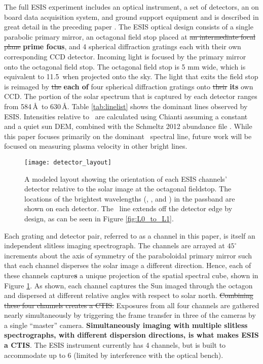 	  	
    	The full ESIS experiment includes an optical instrument, a set of detectors, an on board data acquisition system, and ground support equipment and is described in great detail in the preceding paper \citep{ESIS}.
    	The ESIS optical design consists of a single parabolic primary mirror, an octagonal field stop placed at \sout{an intermediate focal plane} \textbf{prime focus}, and 4 spherical diffraction gratings each with their own corresponding CCD detector.
    	Incoming light is focused by the primary mirror onto the octagonal field stop. 
    	The octagonal field stop is  5 mm wide, which is equivalent to %
    	11.5\arcmin \  when projected onto the sky. 
    	The light that exits the field stop is reimaged  by \sout{the} \textbf{each of} four spherical diffraction gratings onto \sout{their} \textbf{its} own CCD.
    	The portion of the solar spectrum that is captured by each detector ranges from  584\,\AA \ to 630\,\AA. 
    	Table \ref{tab:linelist} shows the dominant lines observed by ESIS.
    	Intensities relative to \ov \ are calculated using Chianti \citep{ChiantiI,ChiantiX} assuming a constant and a quiet sun DEM, combined with the Schmeltz 2012 abundance file \citep{schmelz2012}.
  		While this paper focuses primarily on the dominant \ov \ spectral line, future work will be focused on measuring plasma velocity in other bright lines.
   			
        \begin{figure}
			\begin{center}
				\texttt{[image: detector\_layout]}
				\caption{A modeled layout showing the orientation of each ESIS channels' detector relative to the solar image at the octagonal fieldstop.  The locations of the brightest wavelengths (\hei, \mgxbright, and \ov) in the passband are shown on each detector.  The \hei \ line  extends off the detector edge by design, as can be seen in Figure \ref{fig:L0_to_L1}. }
				\label{fig:level_1_array}
			\end{center}
		\end{figure}

    	Each grating and detector pair, referred to as a channel in this paper,
    	is itself an independent slitless imaging spectrograph.  
    	The channels are arrayed at $45^{\circ}$ increments about the axis of symmetry of the paraboloidal primary mirror such that each channel disperses the solar image a different direction. 
    	Hence, each of these channels capture\textbf{s} a unique projection of the spatial spectral cube, shown in Figure \ref{fig:level_1_array}. 
    	As shown, each channel captures the Sun imaged through the octagon and dispersed at different relative angles with respect to solar north. 
    	\sout{Combining these four channels creates a CTIS.}
    	Exposures from all four channels are gathered nearly simultaneously by triggering the frame transfer in three of the cameras by a single ``master'' camera. 
    	\textbf{Simultaneously imaging with multiple slitless spectrographs, with different dispersion directions, is what makes ESIS a CTIS}. 
    	The ESIS instrument currently has 4 channels, but is built to accommodate up to 6 (limited by interference with the optical bench).

